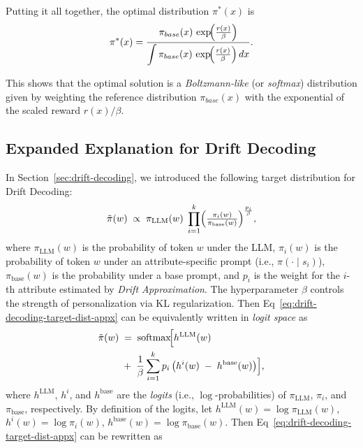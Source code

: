 Putting it all together, the optimal distribution \(\pi^{*}(x)\) is
\[
\pi^{*}(x) 
= \frac{\pi_{base}(x)\,\exp\!\Bigl(\tfrac{r(x)}{\beta}\Bigr)}
       {\displaystyle\int \pi_{base}(x)\,\exp\!\Bigl(\tfrac{r(x)}{\beta}\Bigr)\,dx}.
\]

This shows that the optimal solution is a \emph{Boltzmann-like} (or \emph{softmax}) distribution given by weighting the reference distribution \(\pi_{base}(x)\) with the exponential of the scaled reward \(r(x)/\beta\).

\subsection{Expanded Explanation for Drift Decoding}
\label{appendix:drift-decoding-proof}
In Section~\ref{sec:drift-decoding}, we introduced the following target distribution for Drift Decoding:
\begin{equation}
    \label{eq:drift-decoding-target-dist-appx}
    \tilde{\pi}(w) \;\propto\; \pi_{\text{LLM}}(w) 
    \;\prod_{i=1}^{k} \Bigl(\tfrac{\pi_i(w)}{\pi_{\text{base}}(w)}\Bigr)^{\frac{p_i}{\beta}},
\end{equation}
where \(\pi_{\text{LLM}}(w)\) is the probability of token \(w\) under the LLM, \(\pi_i(w)\) is the probability of token \(w\) under an attribute-specific prompt (i.e., \(\pi(\cdot \mid s_i)\)), \(\pi_{\text{base}}(w)\) is the probability under a base prompt, and \(p_i\) is the weight for the \(i\)-th attribute estimated by \textit{Drift Approximation}. The hyperparameter \(\beta\) controls the strength of personalization via KL regularization.
Then Eq~\eqref{eq:drift-decoding-target-dist-appx} can be equivalently written in \emph{logit space} as
\begin{equation}
\begin{split}
  \tilde{\pi}(w) 
  \;&=\; 
  \text{softmax}\!\Bigl[
     h^{\text{LLM}}(w)
     \;\\ \nonumber &+\;
     \frac{1}{\beta}\sum_{i=1}^{k} 
        p_i\,\bigl(h^i(w) \;-\; h^{\text{base}}(w)\bigr)
  \Bigr], 
\end{split}
\end{equation}
where \(h^\text{LLM}\), \(h^i\), and \(h^\text{base}\) are the \emph{logits} (i.e., \(\log\)-probabilities) of \(\pi_{\text{LLM}}\), \(\pi_i\), and \(\pi_{\text{base}}\), respectively.
By definition of the logits, let $h^{\text{LLM}}(w) = \log \pi_{\text{LLM}}(w)$, $h^i(w) = \log \pi_i(w)$,  $h^{\text{base}}(w) = \log \pi_{\text{base}}(w)$.
Then Eq~\eqref{eq:drift-decoding-target-dist-appx} can be rewritten as
